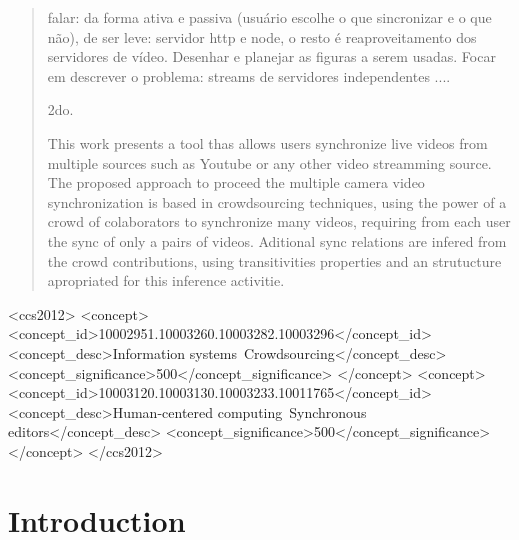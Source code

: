 \documentclass{sig-alternate-05-2015}
\begin{document}
\maketitle
\begin{abstract}
	falar: da forma ativa e passiva (usuário escolhe o que sincronizar e o que não), de ser leve: servidor http e node, o resto é reaproveitamento dos servidores de vídeo. Desenhar e planejar as figuras a serem usadas.
	Focar em descrever o problema: streams de servidores independentes ....

	2do.
	
	
	
This work presents a tool thas allows users synchronize live videos from multiple sources such as Youtube or any other video streamming source. The proposed approach to proceed the multiple camera video synchronization is based in crowdsourcing techniques, using the power of a crowd of colaborators to synchronize many videos, requiring from each user the sync of only a pairs of videos. Aditional sync relations are infered from the crowd contributions, using transitivities properties and an strutucture apropriated for this inference activitie.  
	
	
	
\end{abstract}


%
%
 \begin{CCSXML}
<ccs2012>
	<concept>
		<concept_id>10002951.10003260.10003282.10003296</concept_id>
		<concept_desc>Information systems~Crowdsourcing</concept_desc>
		<concept_significance>500</concept_significance>
	</concept>
	<concept>
		<concept_id>10003120.10003130.10003233.10011765</concept_id>
		<concept_desc>Human-centered computing~Synchronous editors</concept_desc>
		<concept_significance>500</concept_significance>
	</concept>
</ccs2012>
\end{CCSXML}


\printccsdesc


\section{Introduction}
\end{document}
